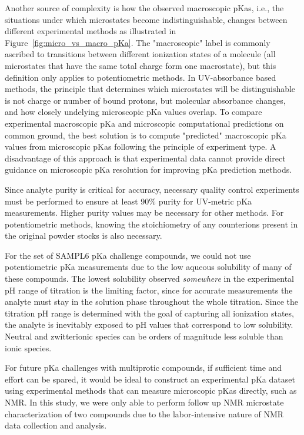 \documentclass[9pt,lineno]{elife}
\begin{document}
Another source of complexity is how the observed macroscopic pKas, i.e., the situations under which microstates become indistinguishable, changes between different experimental methods as illustrated in Figure~\ref{fig:micro_vs_macro_pKa}. 
The "macroscopic" label is commonly ascribed to transitions between different ionization states of a molecule (all microstates that have the same total charge form one macrostate), but this definition only applies to potentiometric methods. 
In UV-absorbance based methods, the principle that determines which microstates will be distinguishable is not charge or number of bound protons, but molecular absorbance changes, and how closely undelying microscopic pKa values overlap. 
To compare experimental macroscopic pKa and microscopic computational predictions on common ground, the best solution is to compute "predicted" macroscopic pKa values from microscopic pKas following the principle of experiment type. 
A disadvantage of this approach is that experimental data cannot provide direct guidance on microscopic pKa resolution for improving pKa prediction methods.

Since analyte purity is critical for accuracy, necessary quality control experiments must be performed to ensure at least 90\% purity for UV-metric pKa measurements. Higher purity values may be necessary for other methods. 
For potentiometric methods, knowing the stoichiometry of any counterions present in the original powder stocks is also necessary.

For the set of SAMPL6 pKa challenge compounds, we could not use potentiometric pKa measurements due to the low aqueous solubility of many of these compounds. The lowest solubility observed \emph{somewhere} in the experimental pH range of titration is the limiting factor, since for accurate measurements the analyte must stay in the solution phase throughout the whole titration. 
Since the titration pH range is determined with the goal of capturing all ionization states, the analyte is inevitably exposed to pH values that correspond to low solubility. 
Neutral and zwitterionic species can be orders of magnitude less soluble than ionic species. 

For future pKa challenges with multiprotic compounds, if sufficient time and effort can be spared, it would be ideal to construct an experimental pKa dataset using experimental methods that can measure microscopic pKas directly, such as NMR. 
In this study, we were only able to perform follow up NMR microstate characterization of two compounds due to the labor-intensive nature of NMR data collection and analysis. 
\end{document}
